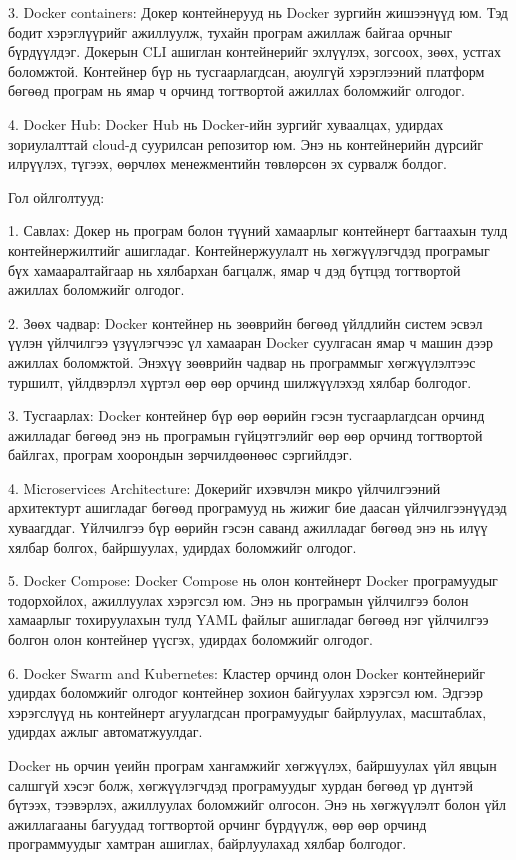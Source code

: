 			3. Docker containers: Докер контейнерууд нь Docker зургийн жишээнүүд юм. Тэд бодит хэрэглүүрийг ажиллуулж, тухайн програм ажиллаж байгаа орчныг бүрдүүлдэг. Докерын CLI ашиглан контейнерийг эхлүүлэх, зогсоох, зөөх, устгах боломжтой. Контейнер бүр нь тусгаарлагдсан, аюулгүй хэрэглээний платформ бөгөөд програм нь ямар ч орчинд тогтвортой ажиллах боломжийг олгодог.
			
			4. Docker Hub: Docker Hub нь Docker-ийн зургийг хуваалцах, удирдах зориулалттай cloud-д суурилсан репозитор юм. Энэ нь контейнерийн дүрсийг илрүүлэх, түгээх, өөрчлөх менежментийн төвлөрсөн эх сурвалж болдог.
			
			Гол ойлголтууд:
			
			1. Савлах: Докер нь програм болон түүний хамаарлыг контейнерт багтаахын тулд контейнержилтийг ашигладаг. Контейнержуулалт нь хөгжүүлэгчдэд програмыг бүх хамааралтайгаар нь хялбархан багцалж, ямар ч дэд бүтцэд тогтвортой ажиллах боломжийг олгодог.
			
			2. Зөөх чадвар: Docker контейнер нь зөөврийн бөгөөд үйлдлийн систем эсвэл үүлэн үйлчилгээ үзүүлэгчээс үл хамааран Docker суулгасан ямар ч машин дээр ажиллах боломжтой. Энэхүү зөөврийн чадвар нь программыг хөгжүүлэлтээс туршилт, үйлдвэрлэл хүртэл өөр өөр орчинд шилжүүлэхэд хялбар болгодог.
			
			3. Тусгаарлах: Docker контейнер бүр өөр өөрийн гэсэн тусгаарлагдсан орчинд ажилладаг бөгөөд энэ нь програмын гүйцэтгэлийг өөр өөр орчинд тогтвортой байлгах, програм хоорондын зөрчилдөөнөөс сэргийлдэг.
			
			4. Microservices Architecture: Докерийг ихэвчлэн микро үйлчилгээний архитектурт ашигладаг бөгөөд програмууд нь жижиг бие даасан үйлчилгээнүүдэд хуваагддаг. Үйлчилгээ бүр өөрийн гэсэн саванд ажилладаг бөгөөд энэ нь илүү хялбар болгох, байршуулах, удирдах боломжийг олгодог.
			
			5. Docker Compose: Docker Compose нь олон контейнерт Docker програмуудыг тодорхойлох, ажиллуулах хэрэгсэл юм. Энэ нь програмын үйлчилгээ болон хамаарлыг тохируулахын тулд YAML файлыг ашигладаг бөгөөд нэг үйлчилгээ болгон олон контейнер үүсгэх, удирдах боломжийг олгодог.
			
			6. Docker Swarm and Kubernetes: Кластер орчинд олон Docker контейнерийг удирдах боломжийг олгодог контейнер зохион байгуулах хэрэгсэл юм. Эдгээр хэрэгслүүд нь контейнерт агуулагдсан програмуудыг байрлуулах, масштаблах, удирдах ажлыг автоматжуулдаг.
			
			Docker нь орчин үеийн програм хангамжийг хөгжүүлэх, байршуулах үйл явцын салшгүй хэсэг болж, хөгжүүлэгчдэд програмуудыг хурдан бөгөөд үр дүнтэй бүтээх, тээвэрлэх, ажиллуулах боломжийг олгосон. Энэ нь хөгжүүлэлт болон үйл ажиллагааны багуудад тогтвортой орчинг бүрдүүлж, өөр өөр орчинд программуудыг хамтран ашиглах, байрлуулахад хялбар болгодог.
	\pagebreak
